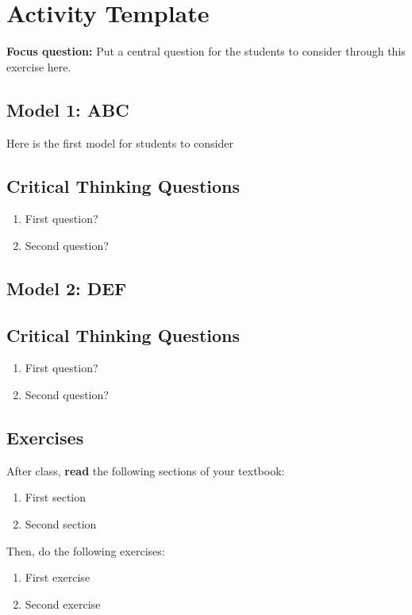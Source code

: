 %
%
%
%

\section{Activity Template}
\renewcommand{\figpath}{content/figs}

\textbf{Focus question:} Put a central question for the students to consider through this exercise here.

\subsection{Model 1:  ABC}

Here is the first model for students to consider


\subsection{Critical Thinking Questions}

	\begin{enumerate}
		\item First question?
		\item Second question?
	\end{enumerate}

\subsection{Model 2: DEF}

\subsection{Critical Thinking Questions}

	\begin{enumerate}
		\item First question?
		\item Second question?
	\end{enumerate}

\subsection{Exercises}

	After class, \textbf{read} the following sections of your textbook:
	
	\begin{enumerate}
		\item First section
		\item Second section
	\end{enumerate}
	
	Then, do the following exercises:
	
	\begin{enumerate}
		\item First exercise
		\item Second exercise
	\end{enumerate}